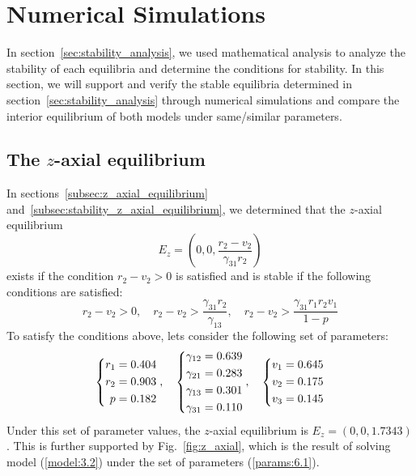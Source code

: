 \section{Numerical Simulations}\label{sec:numerical_simulations}
In section~\ref{sec:stability_analysis}, we used mathematical analysis to analyze the stability of each equilibria and determine the conditions for stability. In this section, we will support and verify the stable equilibria determined in section~\ref{sec:stability_analysis} through numerical simulations and compare the interior equilibrium of both models under same/similar parameters.

\subsection{The $z$-axial equilibrium}\label{subsec:numsim_z_axial_equilibrium}
In sections~\ref{subsec:z_axial_equilibrium} and~\ref{subsec:stability_z_axial_equilibrium}, we determined that the $z$-axial equilibrium
\[
E_z=\left(0,0,\frac{r_2-v_2}{\gamma_{31}r_2}\right)
\]
exists if the condition $r_2-v_2>0$ is satisfied and is stable if the following conditions are satisfied:
\[
r_2-v_2>0,\quad 
r_2-v_2>\frac{\gamma_{31}r_2}{\gamma_{13}},\quad 
r_2-v_2>\frac{\gamma_{31}r_1r_2v_1}{1-p}
\]
To satisfy the conditions above, lets consider the following set of parameters:
\begin{equation}
    \begin{dcases}
        \begin{aligned}
            r_1 &= 0.404\\
            r_2 &= 0.903\\
            p &= 0.182
        \end{aligned}
    \end{dcases},\quad 
    \begin{dcases}
        \begin{aligned}
            \gamma_{12} &= 0.639\\
            \gamma_{21} &= 0.283\\
            \gamma_{13} &= 0.301\\
            \gamma_{31} &= 0.110
        \end{aligned}
    \end{dcases},\quad
    \begin{dcases}
        \begin{aligned}
            v_1 &= 0.645\\
            v_2 &= 0.175\\
            v_3 &= 0.145
        \end{aligned}
    \end{dcases} 
    \label{params:6.1}
\end{equation}
Under this set of parameter values, the $z$-axial equilibrium is $E_z=(0,0,1.7343)$. This is further supported by Fig.~\ref{fig:z_axial}, which is the result of solving model (\ref{model:3.2}) under the set of parameters (\ref{params:6.1}).

